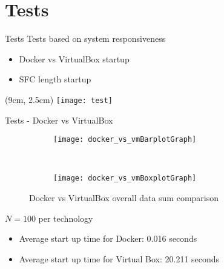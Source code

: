\section{Tests}
\begin{frame}{Tests}
  Tests based on system responsiveness
  \begin{itemize}
    \item<1-> Docker vs VirtualBox startup
    \item<2-> SFC length startup 
  \end{itemize}

  \begin{textblock*}{5cm}(9cm, 2.5cm)
    \texttt{[image: test]}
  \end{textblock*}
\end{frame}

\begin{frame}{Tests - Docker vs VirtualBox}

  \begin{figure}
    \centering
    \begin{subfigure}[b]{0.35\textwidth}
      \texttt{[image: docker\_vs\_vmBarplotGraph]}
    \end{subfigure}
    ~
    \begin{subfigure}[b]{0.35\textwidth}
      \texttt{[image: docker\_vs\_vmBoxplotGraph]}
    \end{subfigure}
    \caption{Docker vs VirtualBox overall data sum comparison}
  \end{figure}

  \noindent $N = 100$ per technology

  \begin{itemize}
  \item Average start up time for Docker: 0.016 seconds
  \item Average start up time for Virtual Box: 20.211 seconds
  \end{itemize}

\end{frame}


